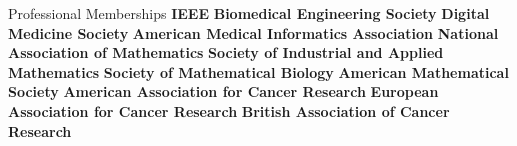 \begin{rubric}{Professional Memberships}
\entry*[2024-] \textbf{IEEE}
\entry*[2024-] \textbf{Biomedical Engineering Society}
\entry*[2024-] \textbf{Digital Medicine Society}
\entry*[2024-] \textbf{American Medical Informatics Association}
\entry*[2023-] \textbf{National Association of Mathematics}
\entry*[2023-] \textbf{Society of Industrial and Applied Mathematics}
\entry*[2023-] \textbf{Society of Mathematical Biology}
\entry*[2022-] \textbf{American Mathematical Society}
\entry*[2021-] \textbf{American Association for Cancer Research}
\entry*[2018-] \textbf{European Association for Cancer Research}
\entry*[2018-2020] \textbf{British Association of Cancer Research}
\end{rubric}